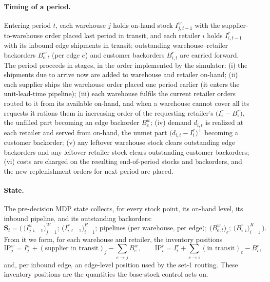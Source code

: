 \documentclass[11pt]{article}
\begin{document}
\paragraph{Timing of a period.}
Entering period $t$, each warehouse $j$ holds on-hand stock $I^w_{j,t-1}$ with the
supplier-to-warehouse order placed last period in transit, and each retailer $i$ holds $I^r_{i,t-1}$
with its inbound edge shipments in transit; outstanding warehouse--retailer backorders $B^w_{e,t}$
(per edge $e$) and customer backorders $B^r_{i,t}$ are carried forward. The period proceeds in stages,
in the order implemented by the simulator: (i) the shipments due to arrive now are added to warehouse
and retailer on-hand; (ii) each supplier ships the warehouse order placed one period earlier (it
enters the unit-lead-time pipeline); (iii) each warehouse fulfils the current retailer orders routed
to it from its available on-hand, and when a warehouse cannot cover all its requests it rations them
in increasing order of the requesting retailer's $\big(I^r_{i}-B^r_{i}\big)$, the unfilled part
becoming an edge backorder $B^w_{e}$; (iv) demand $d_{i,t}$ is realized at each retailer and served
from on-hand, the unmet part $\big(d_{i,t}-I^r_{i}\big)^+$ becoming a customer backorder; (v) any
leftover warehouse stock clears outstanding edge backorders and any leftover retailer stock clears
outstanding customer backorders; (vi) costs are charged on the resulting end-of-period stocks and
backorders, and the new replenishment orders for next period are placed.

\paragraph{State.}
The pre-decision MDP state collects, for every stock point, its on-hand level, its inbound pipeline,
and its outstanding backorders:
\begin{equation*}
  \mathbf S_t = \Big(\, \big(I^w_{j,t-1}\big)_{j=1}^{W};\ \big(I^r_{i,t-1}\big)_{i=1}^{R};\
  \text{pipelines (per warehouse, per edge)};\ \big(B^w_{e,t}\big)_{e};\ \big(B^r_{i,t}\big)_{i=1}^{R} \,\Big).
\end{equation*}
From it we form, for each warehouse and retailer, the inventory positions
\begin{equation*}
  \mathrm{IP}^w_{j}=I^w_{j}+(\text{supplier in transit})_j-\textstyle\sum_{e\to j}B^w_{e},
  \qquad
  \mathrm{IP}^r_{i}=I^r_{i}+\textstyle\sum_{e\to i}(\text{in transit})_e-B^r_{i},
\end{equation*}
and, per inbound edge, an edge-level position used by the set-1 routing. These inventory positions are
the quantities the base-stock control acts on.
\end{document}
